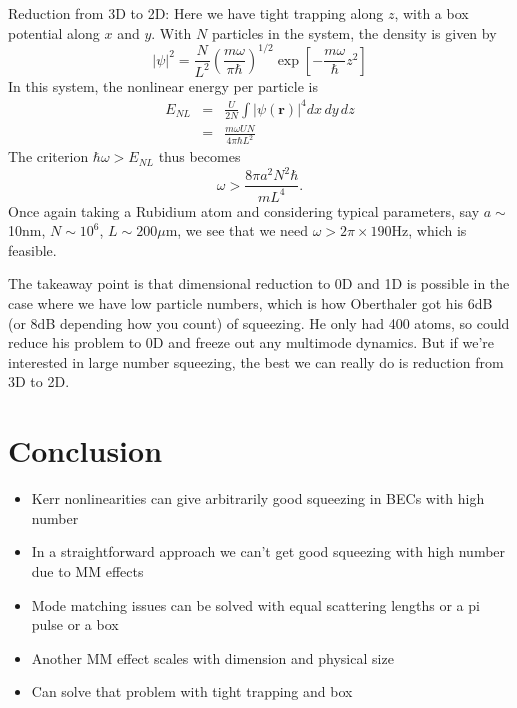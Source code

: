 \documentclass{iopart}
\begin{document}
Reduction from 3D to 2D: Here we have tight trapping along $z$, with a box potential along $x$ and $y$. With $N$ particles in the system, the density is given by
\begin{equation}
|\psi|^2 = \frac{N}{L^2} \left( {\frac{m \omega}{\pi \hbar}} \right) ^{1/2} \exp \left[ -\frac{m \omega} {\hbar} z^2  \right]
\end{equation}
In this system, the nonlinear energy per particle is
\begin{eqnarray}
E_{NL} &=& \frac{U}{2N} \int |\psi({\mathbf{r}})|^4 dx \, dy \, dz \\
       &=& \frac{m \omega U N}{4 \pi \hbar L^2}
\end{eqnarray}
The criterion $\hbar \omega > E_{NL}$ thus becomes
\begin{equation}
\omega > \frac{8 \pi a^2 N^2 \hbar}{m L^4}.
\end{equation}
Once again taking a Rubidium atom and considering typical parameters, say $a\sim$10nm, $N\sim 10^6$, $L\sim 200\mu$m, we see that we need $\omega > 2\pi\times 190$Hz, which is feasible.

The takeaway point is that dimensional reduction to 0D and 1D is possible in the case where we have low particle numbers, which is how Oberthaler got his 6dB (or 8dB depending how you count) of squeezing. He only had 400 atoms, so could reduce his problem to 0D and freeze out any multimode dynamics. But if we're interested in large number squeezing, the best we can really do is reduction from 3D to 2D.



\section{Conclusion}
\label{sectionConclusion}
\begin{itemize}
  \item Kerr nonlinearities can give arbitrarily good squeezing in BECs with high number
  \item In a straightforward approach we can't get good squeezing with high number due to MM effects
  \item Mode matching issues can be solved with equal scattering lengths or a pi pulse or a box
  \item Another MM effect scales with dimension and physical size
  \item Can solve that problem with tight trapping and box
\end{itemize}
\end{document}
